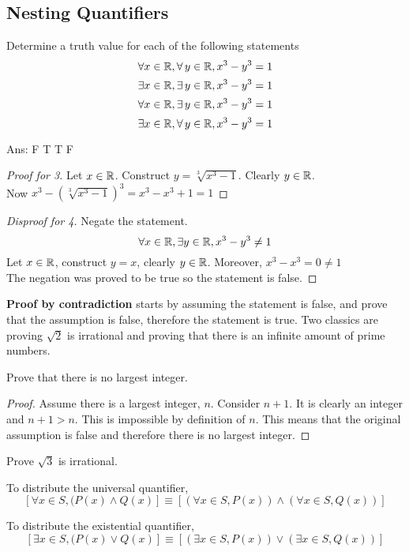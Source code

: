\documentclass[english, 12pt]{article}
\begin{document}
\subsection{Nesting Quantifiers}
\begin{exmp}
Determine a truth value for each of the following statements
\[ \forall x \in {\mathbb{R}}, \forall\, y \in {\mathbb{R}}, x^3-y^3 = 1\]
\[ \exists x \in {\mathbb{R}} , \exists\, y \in {\mathbb{R}}, x^3-y^3 = 1\]
\[ \forall x \in {\mathbb{R}} , \exists\, y \in {\mathbb{R}}, x^3-y^3=1\]
\[ \exists x \in {\mathbb{R}}, \forall\, y \in {\mathbb{R}}, x^3-y^3=1\]
\begin{center}
Ans: F T T F
\end{center}
\end{exmp}
\begin{proof}[Proof for 3]
Let $x \in {\mathbb{R}}$. Construct $y=\sqrt[3]{x^3-1}$. Clearly $y \in {\mathbb{R}}$.\\ Now $x^3 - (\sqrt[3]{x^3-1})^3 = x^3 - x^3 + 1 = 1$
\end{proof}
\begin{proof}[Disproof for 4]
Negate the statement.
\[ \forall x \in {\mathbb{R}}, \exists y \in {\mathbb{R}}, x^3-y^3 \neq 1 \]
Let $x \in {\mathbb{R}}$, construct $y=x$, clearly $y \in {\mathbb{R}}$. Moreover, $x^3-x^3 = 0 \neq 1$\\
The negation was proved to be true so the statement is false.
\end{proof}

\begin{mthd}
\textbf{Proof by contradiction} starts by assuming the statement is false, and prove that the assumption is false, therefore the statement is true. Two classics are proving $\sqrt 2$ is irrational and proving that there is an infinite amount of prime numbers.
\end{mthd}

\begin{exmp}
Prove that there is no largest integer.
\begin{proof}
Assume there is a largest integer, $n$. Consider $n+1$. It is clearly an integer and $n+1 > n$. This is impossible by definition of $n$. This means that the original assumption is false and therefore there is no largest integer.
\end{proof}
\end{exmp}

\begin{exercise}
Prove $\sqrt 3$ is irrational.
\end{exercise}
\begin{defn}
To distribute the universal quantifier,
\[ [\forall x \in S, (P(x) \land Q(x)] \equiv [(\forall x \in S, P(x))\land (\forall x \in S, Q(x))] \]
\end{defn}
\begin{defn}
To distribute the existential quantifier,
\[ [\exists x \in S, (P(x) \lor Q(x)] \equiv [(\exists x \in S, P(x))\lor (\exists x \in S, Q(x))] \]
\end{defn}
\end{document}
